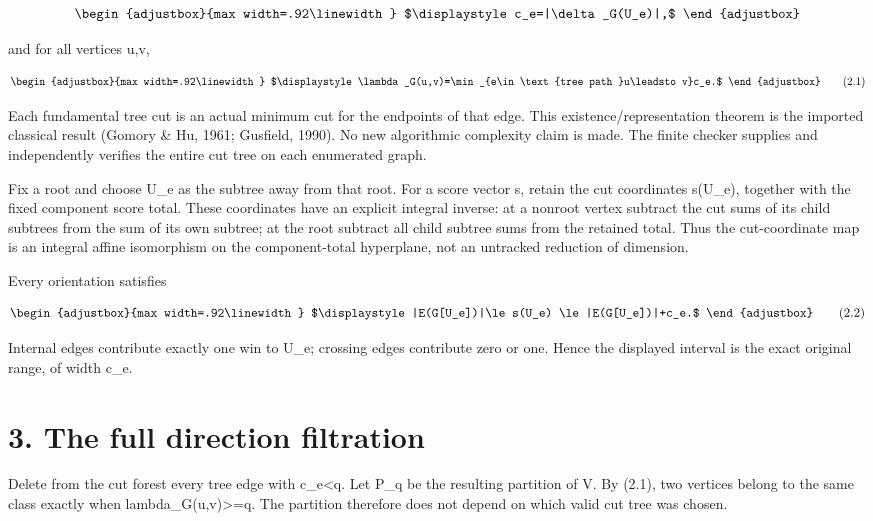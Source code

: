 \[
\begin{adjustbox}{max width=.92\linewidth}
$\displaystyle c_e=|\delta_G(U_e)|,$
\end{adjustbox}
\]

and for all vertices u,v,

\[
\begin{adjustbox}{max width=.92\linewidth}
$\displaystyle \lambda_G(u,v)=\min_{e\in\text{tree path }u\leadsto v}c_e.$
\end{adjustbox}
\tag{2.1}
\]

Each fundamental tree cut is an actual minimum cut for the endpoints of that edge. This existence/representation theorem is the imported classical result (Gomory \& Hu, 1961; Gusfield, 1990). No new algorithmic complexity claim is made. The finite checker supplies and independently verifies the entire cut tree on each enumerated graph.

Fix a root and choose U\_e as the subtree away from that root. For a score vector s, retain the cut coordinates s(U\_e), together with the fixed component score total. These coordinates have an explicit integral inverse: at a nonroot vertex subtract the cut sums of its child subtrees from the sum of its own subtree; at the root subtract all child subtree sums from the retained total. Thus the cut-coordinate map is an integral affine isomorphism on the component-total hyperplane, not an untracked reduction of dimension.

Every orientation satisfies

\[
\begin{adjustbox}{max width=.92\linewidth}
$\displaystyle |E(G[U_e])|\le s(U_e)
 \le |E(G[U_e])|+c_e.$
\end{adjustbox}
\tag{2.2}
\]

Internal edges contribute exactly one win to U\_e; crossing edges contribute zero or one. Hence the displayed interval is the exact original range, of width c\_e.

\section{3. The full direction filtration}\label{n11-the-full-direction-filtration}

Delete from the cut forest every tree edge with c\_e\textless q. Let P\_q be the resulting partition of V. By (2.1), two vertices belong to the same class exactly when lambda\_G(u,v)\textgreater=q. The partition therefore does not depend on which valid cut tree was chosen.

